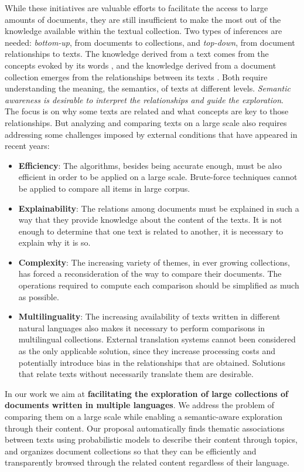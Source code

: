 While these initiatives are valuable efforts to facilitate the access to large amounts of documents, they are still insufficient to make the most out of the knowledge available within the textual collection. Two types of inferences are needed: \textit{bottom-up}, from documents to collections, and \textit{top-down}, from document relationships to texts. The knowledge derived from a text comes from the concepts evoked by its words \citep{Griffiths2007}, and the knowledge derived from a document collection emerges from the relationships between its texts \citep{Kenter2015}. Both require understanding the meaning, the semantics, of texts at different levels. \textit{Semantic awareness is desirable to interpret the relationships and guide the exploration}. The focus is on why some texts are related and what concepts are key to those relationships. But analyzing and comparing texts on a large scale also requires addressing some challenges imposed by external conditions that have appeared in recent years:
\begin{itemize}
\item \textbf{Efficiency}: The algorithms, besides being accurate enough, must be also efficient in order to be applied on a large scale. Brute-force techniques cannot be applied to compare all items in large corpus.
\item \textbf{Explainability}: The relations among documents must be explained in such a way that they provide knowledge about the content of the texts. It is not enough to determine that one text is related to another, it is necessary to explain why it is so. 
\item \textbf{Complexity}: The increasing variety of themes, in ever growing collections, has forced a reconsideration of the way to compare their documents. The operations required to compute each comparison should be simplified as much as possible.
\item \textbf{Multilinguality}: The increasing availability of texts written in different natural languages also makes it necessary to perform comparisons in multilingual collections. External translation systems cannot been considered as the only applicable solution, since they increase processing costs and potentially introduce bias in the relationships that are obtained. Solutions that relate texts without necessarily translate them are desirable.
\end{itemize}

In our work we aim at \textbf{facilitating the exploration of large collections of documents written in multiple languages}. We address the problem of comparing them on a large scale while enabling a semantic-aware exploration through their content. Our proposal automatically finds thematic associations between texts using probabilistic models to describe their content through topics, and organizes document collections so that they can be efficiently and transparently browsed through the related content regardless of their language.

